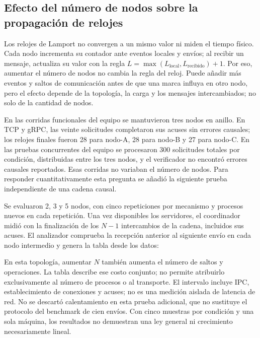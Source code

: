 \subsection{Efecto del número de nodos sobre la propagación de relojes}
Los relojes de Lamport no convergen a un mismo valor ni miden el tiempo físico. Cada nodo incrementa su contador ante eventos locales y envíos; al recibir un mensaje, actualiza su valor con la regla $L=\max(L_{\mathrm{local}},L_{\mathrm{recibido}})+1$. Por eso, aumentar el número de nodos no cambia la regla del reloj. Puede añadir más eventos y saltos de comunicación antes de que una marca influya en otro nodo, pero el efecto depende de la topología, la carga y los mensajes intercambiados; no solo de la cantidad de nodos.

En las corridas funcionales del equipo se mantuvieron tres nodos en anillo. En TCP y gRPC, las veinte solicitudes completaron sus acuses sin errores causales; los relojes finales fueron 28 para nodo-A, 28 para nodo-B y 27 para nodo-C. En las pruebas concurrentes del equipo se procesaron 300 solicitudes totales por condición, distribuidas entre los tres nodos, y el verificador no encontró errores causales reportados. Esas corridas no variaban el número de nodos. Para responder cuantitativamente esta pregunta se añadió la siguiente prueba independiente de una cadena causal.

Se evaluaron 2, 3 y 5 nodos, con cinco repeticiones por mecanismo y procesos nuevos
en cada repetición. Una vez disponibles los servidores, el coordinador midió con
 la finalización de los $N-1$ intercambios de la
cadena, incluidos sus acuses. El analizador comprueba la recepción anterior al
siguiente envío en cada nodo intermedio y genera la tabla desde los datos:

\begin{table}[htbp]
\centering\small

\caption{Duración del recorrido causal coordinado, no sincronización física.}
\label{tab:propagacion-nodos}
\end{table}

En esta topología, aumentar $N$ también aumenta el número de saltos y operaciones.
La tabla describe ese costo conjunto; no permite atribuirlo exclusivamente al
número de procesos o al transporte. El intervalo incluye IPC, establecimiento
de conexiones y acuses; no es una medición aislada de latencia de red. No se
descartó calentamiento en esta prueba adicional, que no sustituye el protocolo
del benchmark de cien envíos. Con cinco muestras por condición y una sola máquina,
los resultados no demuestran una ley general ni crecimiento necesariamente lineal.

